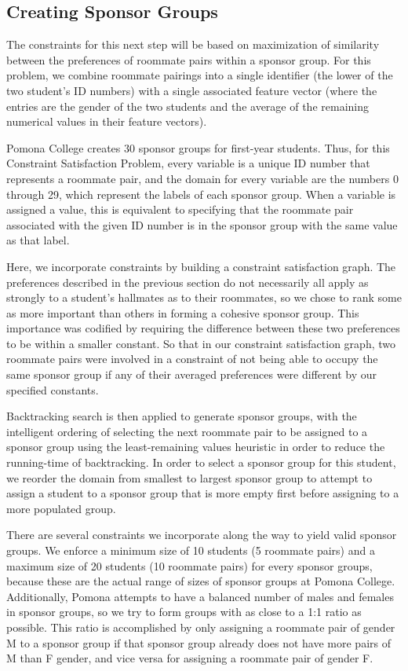 \documentclass[letterpaper]{article}
\begin{document}
\subsection{Creating Sponsor Groups}

The constraints for this next step will be based on maximization of similarity between the preferences of roommate pairs within a sponsor group. For this problem, we combine roommate pairings into a single identifier (the lower of the two student's ID numbers) with a single associated feature vector (where the entries are the gender of the two students and the average of the remaining numerical values in their feature vectors). 

Pomona College creates 30 sponsor groups for first-year students. Thus, for this Constraint Satisfaction Problem, every variable is a unique ID number that represents a roommate pair, and the domain for every variable are the numbers 0 through 29, which represent the labels of each sponsor group. When a variable is assigned a value, this is equivalent to specifying that the roommate pair associated with the given ID number is in the sponsor group with the same value as that label. 

Here, we incorporate constraints by building a constraint satisfaction graph. The preferences described in the previous section do not necessarily all apply as strongly to a student's hallmates as to their roommates, so we chose to rank some as more important than others in forming a cohesive sponsor group. This importance was codified by requiring the difference between these two preferences to be within a smaller constant. So that in our constraint satisfaction graph, two roommate pairs were involved in a constraint of not being able to occupy the same sponsor group if any of their averaged preferences were different by our specified constants. 

Backtracking search is then applied to generate sponsor groups, with the intelligent ordering of selecting the next roommate pair to be assigned to a sponsor group using the least-remaining values heuristic in order to reduce the running-time of backtracking. In order to select a sponsor group for this student, we reorder the domain from smallest to largest sponsor group to attempt to assign a student to a sponsor group that is more empty first before assigning to a more populated group.

There are several constraints we incorporate along the way to yield valid sponsor groups. We enforce a minimum size of 10 students (5 roommate pairs) and a maximum size of 20 students (10 roommate pairs) for every sponsor groups, because these are the actual range of sizes of sponsor groups at Pomona College. Additionally, Pomona attempts to have a balanced number of males and females in sponsor groups, so we try to form groups with as close to a 1:1 ratio as possible. This ratio is accomplished by only assigning a roommate pair of gender M to a sponsor group if that sponsor group already does not have more pairs of M than F gender, and vice versa for assigning a roommate pair of gender F. 
\end{document}
